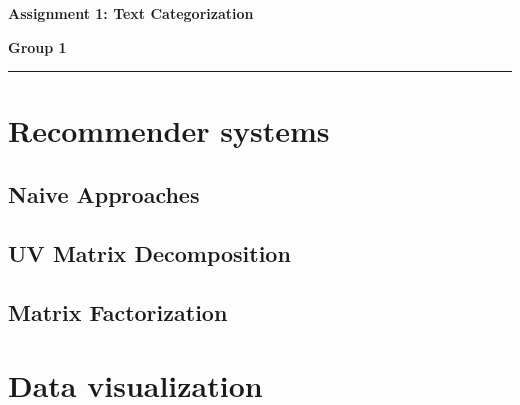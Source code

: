 \documentclass[12pt]{article}
\begin{document}
\begin{flushleft}
    \Large \textbf{Assignment 1: Text Categorization}
\end{flushleft}
\begin{flushleft}
    \textbf{Group 1}\\
\end{flushleft}
\rule{\textwidth}{0.4pt}
\section{Recommender systems}
\subsection{Naive Approaches}

\subsection{UV Matrix Decomposition}

\subsection{Matrix Factorization}

\section{Data visualization}
\end{document}
